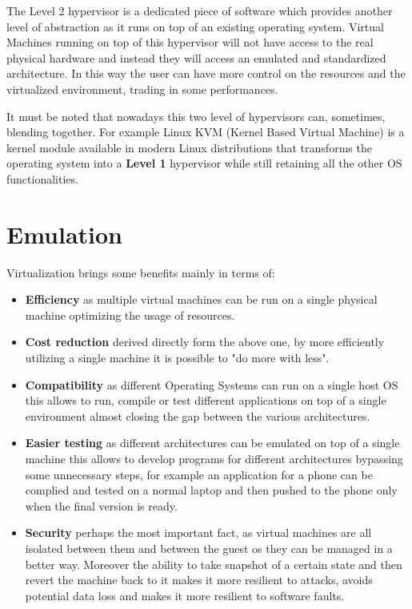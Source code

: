 The Level 2 hypervisor is a dedicated piece of software which provides another level of abstraction as it runs on top of an existing operating system. Virtual Machines running on top of this hypervisor will not have access to the real physical hardware and instead they will access an emulated and standardized architecture. In this way the user can have more control on the resources and the virtualized environment, trading in some performances. 

It must be noted that nowadays this two level of hypervisors can, sometimes, blending together. For example Linux KVM (Kernel Based Virtual Machine) is a kernel module available in modern Linux distributions that transforms the operating system into a \textbf{Level 1} hypervisor while still retaining all the other OS functionalities.

\section{Emulation}
Virtualization brings some benefits mainly in terms of:
\begin{itemize}
    \item \textbf{Efficiency} as multiple virtual machines can be run on a single physical machine optimizing the usage of resources.
    \item \textbf{Cost reduction} derived directly form the above one, by more efficiently utilizing a single machine it is possible to "do more with less".
    \item \textbf{Compatibility} as different Operating Systems can run on a single host OS this allows to run, compile or test different applications on top of a single environment almost closing the gap between the various architectures.
    \item \textbf{Easier testing} as different architectures can be emulated on top of a single machine this allows to develop programs for different architectures bypassing some unnecessary steps, for example an application for a phone can be complied and tested on a normal laptop and then pushed to the phone only when the final version is ready.
    \item \textbf{Security} perhaps the most important fact, as virtual machines are all isolated between them and between the guest os they can be managed in a better way. Moreover the ability to take snapshot of a certain state and then revert the machine back to it makes it more resilient to attacks, avoids potential data loss and makes it more resilient to software faults. 
\end{itemize}

